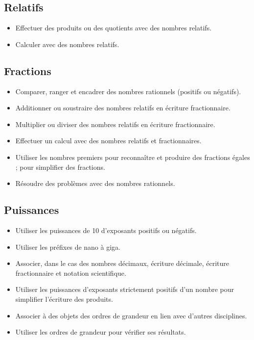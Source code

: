 \documentclass[a4paper,12pt,fleqn]{article}	
\begin{document}
\renewcommand{\labelitemi}{}

\subsection*{Relatifs}

\begin{itemize}
	\item {}Effectuer des produits ou des quotients avec des nombres relatifs.
	\item {}Calculer avec des nombres relatifs.
\end{itemize}

\subsection*{Fractions}

\begin{itemize}
	\item {}Comparer, ranger et encadrer des nombres rationnels (positifs ou négatifs).
	\item {}Additionner ou soustraire des nombres relatifs en écriture fractionnaire.
	\item {}Multiplier ou diviser des nombres relatifs en écriture fractionnaire.
	\item {}Effectuer un calcul avec des nombres relatifs et fractionnaires.
	\item {}Utiliser les nombres premiers pour reconnaître et produire des fractions égales ; pour simplifier des fractions.
	\item {}Résoudre des problèmes avec des nombres rationnels.
\end{itemize}

\subsection*{Puissances}

\begin{itemize}
	\item {}Utiliser les puissances de 10 d’exposants positifs ou négatifs.
	\item {}Utiliser les préfixes de nano à giga.
	\item {}Associer, dans le cas des nombres décimaux, écriture décimale, écriture fractionnaire et notation scientifique.
	\item {}Utiliser les puissances d’exposants strictement positifs d’un nombre pour simplifier l’écriture des produits.
	\item {}Associer à des objets des ordres de grandeur en lien avec d’autres disciplines.
	\item {}Utiliser les ordres de grandeur pour vérifier ses résultats.
\end{itemize}
\end{document}

